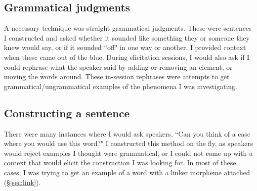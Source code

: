 \subsection{Grammatical judgments}

A necessary technique was straight grammatical judgments. These were sentences I constructed and asked whether it sounded like something they or someone they knew would say, or if it sounded ``off" in one way or another. I provided context when these came out of the blue. During elicitation sessions, I would also ask if I could rephrase what the speaker said by adding or removing an element, or moving the words around. These in-session rephrases were attempts to get grammatical/ungrammatical examples of the phenomena I was investigating.

\subsection{Constructing a sentence}

There were many instances where I would ask speakers, ``Can you think of a case where you would use this word?" I constructed this method on the fly, as speakers would reject examples I thought were grammatical, or I could not come up with a context that would elicit the construction I was looking for. In most of these cases, I was trying to get an example of a word with a linker morpheme attached (\S\ref{sec:link}).


